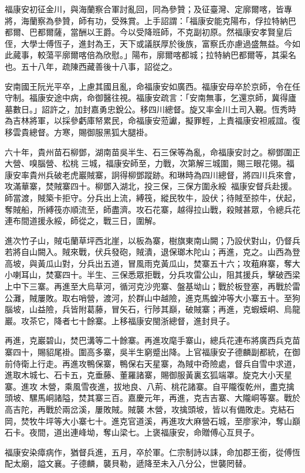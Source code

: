 \begin{pinyinscope}
福康安初征金川，與海蘭察合軍討亂回，同為參贊；及征臺灣、定廓爾喀，皆專將，海蘭察為參贊，師有功，受殊賞。上手詔謂：「福康安能克陽布，俘拉特納巴都爾、巴都爾薩，當酬以王爵。今以受降班師，不克副初原。然福康安孝賢皇后侄，大學士傅恆子，進封為王，天下或議朕厚於後族，富察氏亦慮過盛無益。今如此蕆事，較蕩平廓爾喀倍為欣慰。」陽布，廓爾喀都城；拉特納巴都爾等，其渠名也。五十八年，疏陳西藏善後十八事，詔從之。

安南國王阮光平卒，上慮其國且亂，命福康安如廣西。福康安母卒於京師，令在任守制。福康安途中病，命御醫往視。福康安疏言：「安南無事，乞還京師，冀得廬墓數日。」詔許之，加封嘉勇忠銳公。移四川總督。旋又率金川土司入覲。恆秀時為吉林將軍，以採參虧庫帑累民，命福康安蒞讞，擬罪輕，上責福康安袒戚誼。復移雲貴總督。方寒，賜御服黑狐大腿褂。

六十年，貴州苗石柳鄧，湖南苗吳半生、石三保等為亂，命福康安討之。柳鄧圍正大營、嗅腦營、松桃三城，福康安師至，力戰，次第解三城圍，賜三眼花翎。福康安率貴州兵破老虎巖賊寨，詗得柳鄧蹤跡。和琳時為四川總督，將四川兵來會，攻滿華寨，焚賊寨四十。柳鄧入湖北，投三保，三保方圍永綏，福康安督兵赴援。師當渡，賊築卡拒守。分兵出上流，縛筏，縱民牧牛，設伏；待賊至掠牛，伏起，奪賊船，所縛筏亦順流至，師盡濟。攻石花寨，越得拉山戰，殺賊甚眾，令總兵花連布間道援永綏，師從之，戰三日，圍解。

進次竹子山，賊屯蘭草坪西北崖，以板為寨，樹旗東南山闕；乃設伏對山，仍督兵若將自山闕入。賊來戰，伏兵發砲，賊潰，退保瑯木陀山；再進，克之。山西為登高坡，與黃瓜山對，分兵出五道，冒風雨克黃瓜山，焚寨五十六；攻蒩麻寨，奪大小喇耳山，焚寨四十。半生、三保悉眾拒戰，分兵攻雷公山，阻其援兵，擊破西梁上中下三寨。再進至大烏草河，循河克沙兜寨、盤基坳山；戰於板登塞，再戰於雷公灘，賊屢敗。取右哨營，渡河，於群山中越險，進克馬蝗沖等大小寨五十。至狗腦坡，山益險，兵皆附葛藤，冒矢石，行陟其巔，破賊寨；再進，克蝦蟆峒、烏龍巖。攻茶它，降者七十餘寨。上移福康安閩浙總督，進封貝子。

再進，克巖碧山，焚巴溝等二十餘寨。再進攻麾手寨山，總兵花連布將廣西兵克苗寨四十，賜貂尾褂。圍高多寨，吳半生窮蹙出降。上官福康安子德麟副都統，在御前侍衛上行走。再進攻鴨保寨，鴨保右天星寨，為賊中奇險處，督兵自雪中求道，進取木城七、石卡五，克垂藤、董羅諸寨，賜御服黃裏玄狐端罩。旋克大小天星寨。進攻木營，乘風雪夜進，拔地良、八荊、桃花諸寨。自平隴復乾州，盡克擒頭坡、騾馬峒諸隘，焚其寨三百。嘉慶元年，再進，克吉吉寨、大隴峒等寨。戰於高吉陀，再戰於兩岔溪，屢敗賊。賊襲木營，攻擒頭坡，皆以有備敗走。克結石岡，焚牧牛坪等大小寨七十。進克官道溪，再進攻大麻營石城，至廖家沖，奪山巔石卡。夜間，道出連峰坳，奪山梁七。上褒福康安，命贈傅心互貝子。

福康安染瘴病作，猶督兵進，五月，卒於軍。仁宗制詩以誄，命加郡王銜，從傅恆配太廟，謚文襄。子德麟，襲貝勒，遞降至未入八分公，世襲罔替。


\end{pinyinscope}
